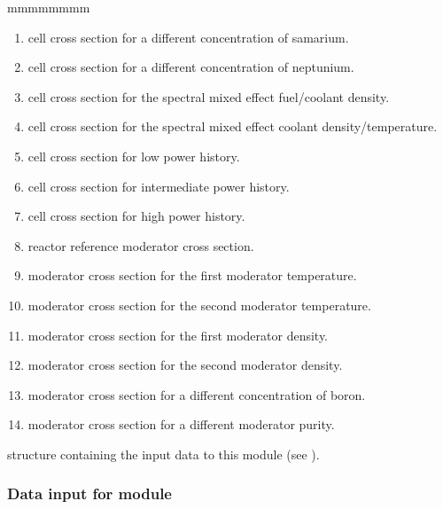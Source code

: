 \begin{ListeDeDescription}{mmmmmmmm}
\begin{enumerate}
\item cell cross section for a different concentration of samarium.

\item cell cross section for a different concentration of neptunium.

\item cell cross section for the spectral mixed effect fuel/coolant density.

\item cell cross section for the spectral mixed effect coolant density/temperature.

\item cell cross section for low power history. 

\item cell cross section for intermediate power history. 

\item cell cross section for high power history. 

\item reactor reference moderator cross section.

\item moderator cross section for the first moderator temperature.

\item moderator cross section for the second moderator temperature.

\item moderator cross section for the first moderator density. 

\item moderator cross section for the second moderator density.

\item moderator cross section for a different concentration of boron. 

\item moderator cross section for a different moderator purity.

\end{enumerate}

\item[\dstr{desccfc}] structure containing the input data to this module (see
).

\end{ListeDeDescription}


\subsubsection{Data input for module }\label{sect:desccfc}

